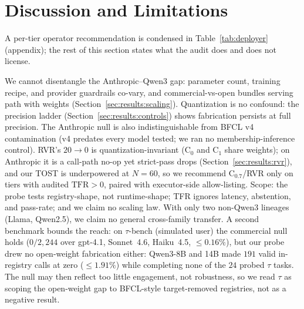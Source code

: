 \section{Discussion and Limitations}
\label{sec:limitations}
\label{sec:limitations:rvr-null}

A per-tier operator recommendation is condensed in
Table~\ref{tab:deployer} (appendix); the rest of this section states what
the audit does and does not license.

We cannot disentangle the Anthropic--Qwen3 gap: parameter count, training recipe, and provider guardrails co-vary, and commercial-vs-open bundles serving path with weights (Section~\ref{sec:results:scaling}). Quantization is no confound: the precision ladder (Section~\ref{sec:results:controls}) shows fabrication persists at full precision. The Anthropic null is also indistinguishable from BFCL v4 contamination (v4 predates every model tested; we ran no membership-inference control). RVR's $20\!\to\!0$ is quantization-invariant ($\mathrm{C}_0$ and $\mathrm{C}_1$ share weights); on Anthropic it is a call-path no-op yet strict-pass drops (Section~\ref{sec:results:rvr}), and our TOST is underpowered at $N\!=\!60$, so we recommend $\mathrm{C}_{0.7}$/RVR only on tiers with audited $\mathrm{TFR}\!>\!0$, paired with executor-side allow-listing. Scope: the probe tests registry-shape, not runtime-shape; TFR ignores latency, abstention, and pass-rate; and we claim no scaling law. With only two non-Qwen3 lineages (Llama, Qwen2.5), we claim no general cross-family transfer. A second benchmark bounds the reach: on $\tau$-bench (simulated user) the commercial null holds ($0/2{,}244$ over gpt-4.1, Sonnet~4.6, Haiku~4.5, $\leq\!0.16\%$), but our probe drew no open-weight fabrication either: Qwen3-8B and 14B made $191$ valid in-registry calls at zero ($\leq\!1.91\%$) while completing none of the $24$ probed $\tau$ tasks. The null may then reflect too little engagement, not robustness, so we read $\tau$ as scoping the open-weight gap to BFCL-style target-removed registries, not as a negative result.
